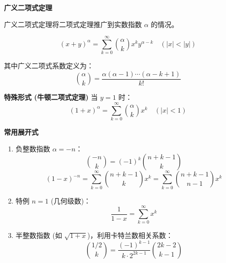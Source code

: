 \textbf{广义二项式定理}

广义二项式定理将二项式定理推广到实数指数 $\alpha$ 的情况。

\[
(x+y)^\alpha = \sum_{k=0}^\infty \binom{\alpha}{k} x^k y^{\alpha-k} \quad (|x| < |y|)
\]

其中广义二项式系数定义为：
\[
\binom{\alpha}{k} = \frac{\alpha (\alpha - 1) \cdots (\alpha - k + 1)}{k!}
\]

\textbf{特殊形式 (牛顿二项式定理)}
当 $y=1$ 时：
\[
(1+x)^\alpha = \sum_{k=0}^\infty \binom{\alpha}{k} x^k \quad (|x| < 1)
\]

\textbf{常用展开式}
\begin{enumerate}
    \item 负整数指数 $\alpha = -n$：
    \[
    \binom{-n}{k} = (-1)^k \binom{n+k-1}{k}
    \]
    \[
    (1-x)^{-n} = \sum_{k=0}^\infty \binom{n+k-1}{k} x^k = \sum_{k=0}^\infty \binom{n+k-1}{n-1} x^k
    \]
    \item 特例 $n=1$ (几何级数)：
    \[
    \frac{1}{1-x} = \sum_{k=0}^\infty x^k
    \]
    \item 半整数指数 (如 $\sqrt{1+x}$)，利用卡特兰数相关系数：
    \[
    \binom{1/2}{k} = \frac{(-1)^{k-1}}{k \cdot 2^{2k-1}} \binom{2k-2}{k-1}
    \]
\end{enumerate}
